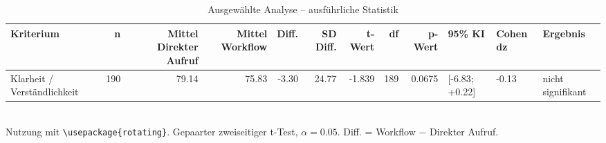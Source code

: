 \begin{table}
\centering
\caption{Ausgewählte Analyse -- ausführliche Statistik}
\begin{tabular}{lrrrrrrrrlll}
\toprule
Kriterium & n & Mittel Direkter Aufruf & Mittel Workflow & Diff. & SD Diff. & t-Wert & df & p-Wert & 95\% KI & Cohen dz & Ergebnis \\
\midrule
Klarheit / Verständlichkeit & 190 & 79.14 & 75.83 & -3.30 & 24.77 & -1.839 & 189 & 0.0675 & [-6.83; +0.22] & -0.13 & nicht signifikant \\
\bottomrule
\end{tabular}
\\[2mm]
\footnotesize Nutzung mit \texttt{\textbackslash usepackage\{rotating\}}. Gepaarter zweiseitiger t-Test, $\alpha=0.05$. Diff. = Workflow $-$ Direkter Aufruf.
\end{table}
